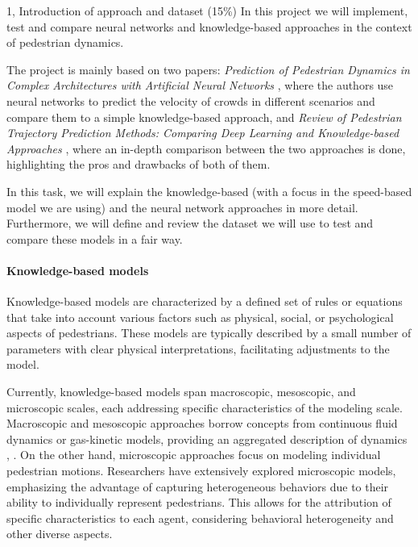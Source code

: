 \begin{task}{1, Introduction of approach and dataset (15\%)}
In this project we will implement, test and compare neural networks and knowledge-based approaches in the context of pedestrian dynamics. 

The project is mainly based on two papers: \textit{Prediction of Pedestrian Dynamics in Complex Architectures with Artificial
Neural Networks} \cite{tordeux2020prediction}, where the authors use neural networks to predict the velocity of crowds in different scenarios and compare them to a simple knowledge-based approach, and \textit{Review of Pedestrian Trajectory Prediction Methods: Comparing Deep
Learning and Knowledge-based Approaches} \cite{korbmacher2022review}, where an in-depth comparison between the two approaches is done, highlighting the pros and drawbacks of both of them.

In this task, we will explain the knowledge-based (with a focus in the speed-based model we are using) and the neural network approaches in more detail. Furthermore, we will define and review the dataset we will use to test and compare these models in a fair way.

\paragraph{Knowledge-based models}
Knowledge-based models are characterized by a defined set of rules or equations that take into account various factors such as physical, social, or psychological aspects of pedestrians. These models are typically described by a small number of parameters with clear physical interpretations, facilitating adjustments to the model. 

Currently, knowledge-based models span macroscopic, mesoscopic, and microscopic scales, each addressing specific characteristics of the modeling scale. Macroscopic and mesoscopic approaches borrow concepts from continuous fluid dynamics or gas-kinetic models, providing an aggregated description of dynamics \cite{henderson1971statistics}, \cite{henderson1974fluid}. On the other hand, microscopic approaches focus on modeling individual pedestrian motions. Researchers have extensively explored microscopic models, emphasizing the advantage of capturing heterogeneous behaviors due to their ability to individually represent pedestrians. This allows for the attribution of specific characteristics to each agent, considering behavioral heterogeneity and other diverse aspects. 


\end{task}
